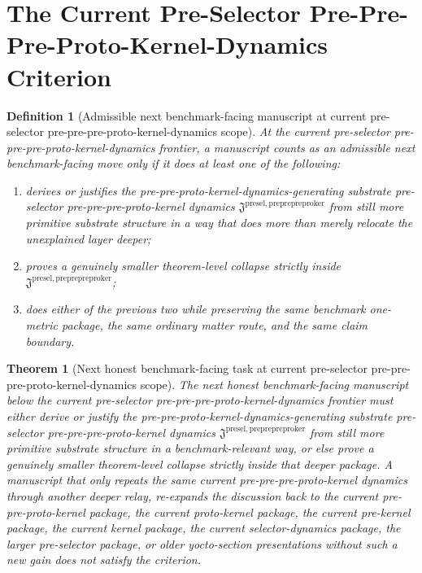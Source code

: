 \documentclass[11pt]{article}
\newcommand{\PrePrePreProtoKernelPackage}{\mathfrak J^{\mathrm{presel,preprepreproker}}}
\newtheorem{definition}{Definition}
\newtheorem{theorem}{Theorem}
\begin{document}
\section{The Current Pre-Selector Pre-Pre-Pre-Proto-Kernel-Dynamics Criterion}

\begin{definition}[Admissible next benchmark-facing manuscript at current pre-selector pre-pre-pre-proto-kernel-dynamics scope]
At the current pre-selector pre-pre-pre-proto-kernel-dynamics frontier, a manuscript counts as an admissible next benchmark-facing move only if it does at least one of the following:
\begin{enumerate}
    \item derives or justifies the pre-pre-proto-kernel-dynamics-generating substrate pre-selector pre-pre-pre-proto-kernel dynamics \(\PrePrePreProtoKernelPackage\) from still more primitive substrate structure in a way that does more than merely relocate the unexplained layer deeper;
    \item proves a genuinely smaller theorem-level collapse strictly inside \(\PrePrePreProtoKernelPackage\);
    \item does either of the previous two while preserving the same benchmark one-metric package, the same ordinary matter route, and the same claim boundary.
\end{enumerate}
\end{definition}

\begin{theorem}[Next honest benchmark-facing task at current pre-selector pre-pre-pre-proto-kernel-dynamics scope]
The next honest benchmark-facing manuscript below the current pre-selector pre-pre-pre-proto-kernel-dynamics frontier must either derive or justify the pre-pre-proto-kernel-dynamics-generating substrate pre-selector pre-pre-pre-proto-kernel dynamics \(\PrePrePreProtoKernelPackage\) from still more primitive substrate structure in a benchmark-relevant way, or else prove a genuinely smaller theorem-level collapse strictly inside that deeper package. A manuscript that only repeats the same current pre-pre-pre-proto-kernel dynamics through another deeper relay, re-expands the discussion back to the current pre-pre-proto-kernel package, the current proto-kernel package, the current pre-kernel package, the current kernel package, the current selector-dynamics package, the larger pre-selector package, or older yocto-section presentations without such a new gain does not satisfy the criterion.
\end{theorem}
\end{document}
